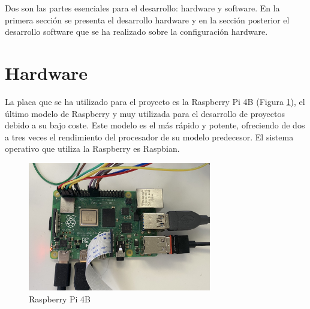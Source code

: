 Dos son las partes esenciales para el desarrollo: hardware y software. En la primera sección se presenta el desarrollo hardware y en la sección posterior el desarrollo software que se ha realizado sobre la configuración hardware.


\section{Hardware}
La placa que se ha utilizado para el proyecto es la Raspberry Pi 4B (Figura \ref{fig:rasp}), el último modelo de Raspberry y muy utilizada para el desarrollo de proyectos debido a su bajo coste. Este modelo es el más rápido y potente, ofreciendo de dos a tres veces el rendimiento del procesador de su modelo predecesor. El sistema operativo que utiliza la Raspberry es Raspbian.
\begin{figure} [h!]
  \begin{center}
    \includegraphics[width=8cm]{figs/raspberry}
  \end{center}
  \caption{Raspberry Pi 4B}
  \label{fig:rasp}
\end{figure}\\

